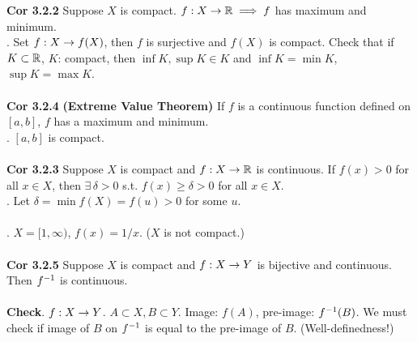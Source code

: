 \textbf{Cor 3.2.2} Suppose $X$ is compact. $f:X\rightarrow \mathbb{R} \implies f$ has maximum and minimum.\\
\pf. Set $f: X\rightarrow f(X)$, then $f$ is surjective and $f(X)$ is compact. Check that if $K\subset \mathbb{R}$, $K$: compact, then $\inf K, \sup K \in K$ and $\inf K = \min K$, $\sup K = \max K$.\\
\\
\textbf{Cor 3.2.4} \textbf{(Extreme Value Theorem)} If $f$ is a continuous function defined on $[a, b]$, $f$ has a maximum and minimum.\\
\pf. $[a, b]$ is compact.\\
\\
\textbf{Cor 3.2.3} Suppose $X$ is compact and $f:X\rightarrow \mathbb{R}$ is continuous. If $f(x) > 0$ for all $x\in X$, then $\exists\, \delta > 0$ s.t. $f(x)\geq \delta >0$ for all $x\in X$.\\
\pf. Let $\delta = \min f(X) = f(u) > 0$ for some $u$.\\
\\
\rmk. $X = [1, \infty)$, $f(x) = 1/x$. ($X$ is not compact.)\\
\\
\textbf{Cor 3.2.5} Suppose $X$ is compact and $f:X\rightarrow Y$ is bijective and continuous. Then $f^{-1}$ is continuous.\\
\\
\textbf{Check}. $f:X\rightarrow Y$. $A\subset X, B\subset Y$. Image: $f(A)$, pre-image: $f^{-1} (B)$. We must check if image of $B$ on $f^{-1}$ is equal to the pre-image of $B$. (Well-definedness!)
\pagebreak